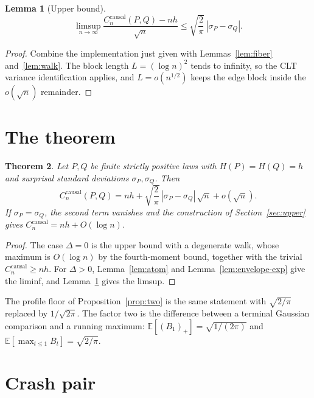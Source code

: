\documentclass[11pt]{article}
\newtheorem{theorem}{Theorem}
\newtheorem{lemma}[theorem]{Lemma}
\theoremstyle{definition}
\newcommand{\causal}{\mathrm{causal}}
\newcommand{\E}{\mathbb{E}}
\begin{document}
\begin{lemma}[Upper bound]
\label{lem:upper}
\[
  \limsup_{n\to\infty}
  \frac{C_n^{\causal}(P,Q)-nh}{\sqrt{n}}
  \le
  \sqrt{\frac{2}{\pi}}\,|\sigma_P-\sigma_Q|.
\]
\end{lemma}

\begin{proof}
Combine the implementation just given with Lemmas~\ref{lem:fiber} and~\ref{lem:walk}.
The block length \(L=(\log n)^2\) tends to infinity, so the CLT variance identification applies, and \(L=o(n^{1/2})\) keeps the edge block inside the \(o(\sqrt{n})\) remainder.
\end{proof}

\section{The theorem}

\begin{theorem}
\label{thm:main}
Let \(P,Q\) be finite strictly positive laws with \(H(P)=H(Q)=h\) and surprisal standard deviations \(\sigma_P,\sigma_Q\).
Then
\begin{equation}
  \label{eq:main}
  C_n^{\causal}(P,Q)
  =
  nh+\sqrt{\frac{2}{\pi}}\,|\sigma_P-\sigma_Q|\,\sqrt{n}+o(\sqrt{n}).
\end{equation}
If \(\sigma_P=\sigma_Q\), the second term vanishes and the construction of Section~\ref{sec:upper} gives \(C_n^{\causal}=nh+O(\log n)\).
\end{theorem}

\begin{proof}
The case \(\Delta=0\) is the upper bound with a degenerate walk, whose maximum is \(O(\log n)\) by the fourth-moment bound, together with the trivial \(C_n^{\causal}\ge nh\).
For \(\Delta>0\), Lemma~\ref{lem:atom} and Lemma~\ref{lem:envelope-exp} give the liminf, and Lemma~\ref{lem:upper} gives the limsup.
\end{proof}

The profile floor of Proposition~\ref{prop:two} is the same statement with \(\sqrt{2/\pi}\) replaced by \(1/\sqrt{2\pi}\).
The factor two is the difference between a terminal Gaussian comparison and a running maximum: \(\E[(B_1)_+]=\sqrt{1/(2\pi)}\) and \(\E[\max_{t\le 1} B_t]=\sqrt{2/\pi}\).

\section{Crash pair}
\end{document}
